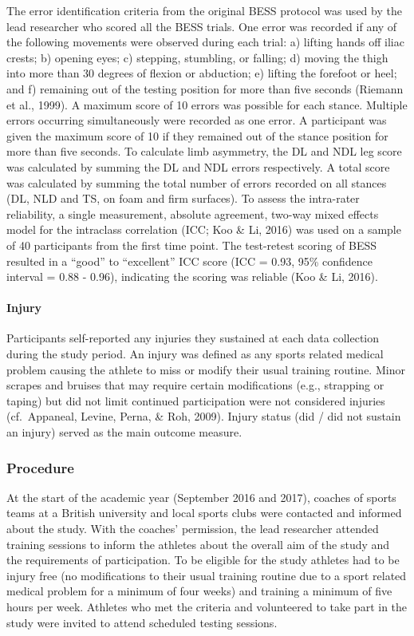 \documentclass[man,floatsintext]{apa6}
\let\oldparagraph\paragraph
\renewcommand{\paragraph}[1]{\oldparagraph{#1}\mbox{}}
\begin{document}
The error identification criteria from the original BESS protocol was used by the lead researcher who scored all the BESS trials.
One error was recorded if any of the following movements were observed during each trial: a) lifting hands off iliac crests;
b) opening eyes;
c) stepping, stumbling, or falling;
d) moving the thigh into more than 30 degrees of flexion or abduction;
e) lifting the forefoot or heel; and
f) remaining out of the testing position for more than five seconds (Riemann et al., 1999).
A maximum score of 10 errors was possible for each stance. Multiple errors occurring simultaneously were recorded as one error.
A participant was given the maximum score of 10 if they remained out of the stance position for more than five seconds.
To calculate limb asymmetry, the DL and NDL leg score was calculated by summing the DL and NDL errors respectively.
A total score was calculated by summing the total number of errors recorded on all stances (DL, NLD and TS, on foam and firm surfaces).
To assess the intra-rater reliability, a single measurement, absolute agreement, two-way mixed effects model for the intraclass correlation (ICC; Koo \& Li, 2016) was used on a sample of 40 participants from the first time point.
The test-retest scoring of BESS resulted in a \enquote{good} to \enquote{excellent} ICC score (ICC = 0.93, 95\% confidence interval = 0.88 - 0.96), indicating the scoring was reliable (Koo \& Li, 2016).

\hypertarget{injury}{%
\paragraph{Injury}\label{injury}}

Participants self-reported any injuries they sustained at each data collection during the study period.
An injury was defined as any sports related medical problem causing the athlete to miss or modify their usual training routine.
Minor scrapes and bruises that may require certain modifications (e.g., strapping or taping) but did not limit continued participation were not considered injuries (cf.~Appaneal, Levine, Perna, \& Roh, 2009).
Injury status (did / did not sustain an injury) served as the main outcome measure.

\hypertarget{procedure}{%
\subsubsection{Procedure}\label{procedure}}

At the start of the academic year (September 2016 and 2017), coaches of sports teams at a British university and local sports clubs were contacted and informed about the study.
With the coaches' permission, the lead researcher attended training sessions to inform the athletes about the overall aim of the study and the requirements of participation.
To be eligible for the study athletes had to be injury free (no modifications to their usual training routine due to a sport related medical problem for a minimum of four weeks) and training a minimum of five hours per week.
Athletes who met the criteria and volunteered to take part in the study were invited to attend scheduled testing sessions.
\end{document}
